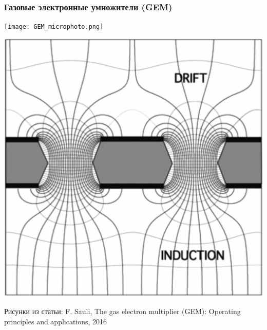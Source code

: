 \documentclass[14pt]{beamer}
\begin{document}
\begin{frame}
\frametitle{Газовые электронные умножители (GEM)}
\begin{center}
	\begin{minipage}[h]{0.49\linewidth}
		\texttt{[image: GEM\_microphoto.png]}
	\end{minipage}
	\begin{minipage}[h]{0.49\linewidth}
		\includegraphics[width=1\linewidth]{GEM_crossec.jpg}
	\end{minipage}
	\tiny{Рисунки из статьи: F. Sauli, The gas electron multiplier (GEM): Operating principles and applications, 2016}
	
\end{center}
\end{frame}
\end{document}
